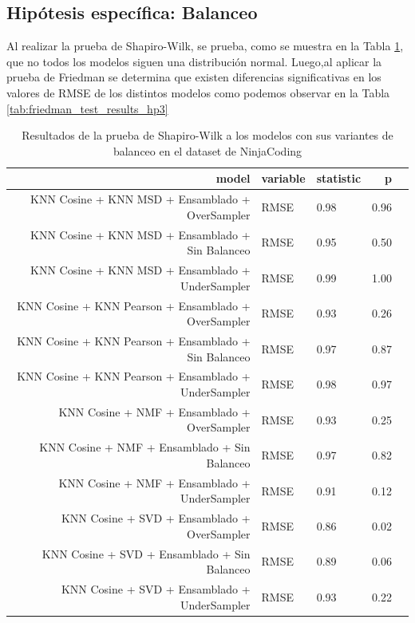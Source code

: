 \subsection{Hipótesis específica: Balanceo}

Al realizar la prueba de Shapiro-Wilk, se prueba, como se muestra en la Tabla \ref{tab:shapiro_test_results_hp3}, que no todos los modelos siguen una distribución normal. Luego,al aplicar la prueba de Friedman se determina que existen diferencias significativas en los valores de RMSE de los distintos modelos como podemos observar en la Tabla \ref{tab:friedman_test_results_hp3} \\


\begin{table}[H]
\caption{Resultados de la prueba de Shapiro-Wilk a los modelos con sus variantes de balanceo en el dataset de NinjaCoding}
\label{tab:shapiro_test_results_hp3}
\centering
\begin{tabular}{rllrr}
    \hline
        model & variable & statistic & p \\ \hline
        KNN Cosine + KNN MSD + Ensamblado + OverSampler & RMSE & 0.98 & 0.96 \\ \hline
        KNN Cosine + KNN MSD + Ensamblado + Sin Balanceo & RMSE & 0.95 & 0.50 \\ \hline
        KNN Cosine + KNN MSD + Ensamblado + UnderSampler & RMSE & 0.99 & 1.00 \\ \hline
        KNN Cosine + KNN Pearson + Ensamblado + OverSampler & RMSE & 0.93 & 0.26 \\ \hline
        KNN Cosine + KNN Pearson + Ensamblado + Sin Balanceo & RMSE & 0.97 & 0.87 \\ \hline
        KNN Cosine + KNN Pearson + Ensamblado + UnderSampler & RMSE & 0.98 & 0.97 \\ \hline
        KNN Cosine + NMF + Ensamblado + OverSampler & RMSE & 0.93 & 0.25 \\ \hline
        KNN Cosine + NMF + Ensamblado + Sin Balanceo & RMSE & 0.97 & 0.82 \\ \hline
        KNN Cosine + NMF + Ensamblado + UnderSampler & RMSE & 0.91 & 0.12 \\ \hline
        KNN Cosine + SVD + Ensamblado + OverSampler & RMSE & 0.86 & 0.02 \\ \hline
        KNN Cosine + SVD + Ensamblado + Sin Balanceo & RMSE & 0.89 & 0.06 \\ \hline
        KNN Cosine + SVD + Ensamblado + UnderSampler & RMSE & 0.93 & 0.22 \\ \hline

\end{tabular}
\end{table}
